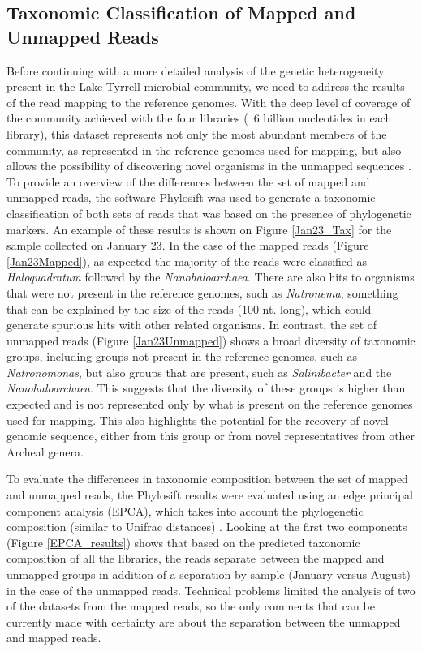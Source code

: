 \clearpage
\subsection{Taxonomic Classification of Mapped and Unmapped Reads}

Before continuing with a more detailed analysis of the genetic heterogeneity present in the Lake Tyrrell microbial community, we need to address the results of the read mapping to the reference genomes. With the deep level of coverage of the community achieved with the four libraries (~6 billion nucleotides in each library), this dataset represents not only the most abundant members of the community, as represented in the reference genomes used for mapping, but also allows the possibility of discovering novel organisms in the unmapped sequences \cite{Narasingarao:2012kp,Albertsen:2013gpa}. To provide an overview of the differences between the set of mapped and unmapped reads, the software Phylosift  \cite{Darling:2014ej} was used to generate a taxonomic classification of both sets of reads that was based on the presence of phylogenetic markers. An example of these results is shown on Figure \ref{Jan23_Tax} for the sample collected on January 23. In the case of the mapped reads (Figure \ref{Jan23Mapped}), as expected the majority of the reads were classified as \textit{Haloquadratum} followed by the \textit{Nanohaloarchaea}. There are also hits to organisms that were not present in the reference genomes, such as \textit{Natronema}, something that can be explained by the size of the reads (100 nt. long), which could generate spurious hits with other related organisms. In contrast, the set of unmapped reads (Figure \ref{Jan23Unmapped}) shows a broad diversity of taxonomic groups, including groups not present in the reference genomes, such as \textit{Natronomonas}, but also groups that are present, such as \textit{Salinibacter} and the \textit{Nanohaloarchaea}. This suggests that the diversity of these groups is higher than expected and is not represented only by what is present on the reference genomes used for mapping. This also highlights the potential for the recovery of novel genomic sequence, either from this group or from novel representatives from other Archeal genera.

To evaluate the differences in taxonomic composition between the set of mapped and unmapped reads, the Phylosift results were evaluated using an edge principal component analysis (EPCA), which takes into account the phylogenetic composition (similar to Unifrac distances) \cite{Matsen:2011wn}. Looking at the first two components (Figure \ref{EPCA_results}) shows that based on the predicted taxonomic composition of all the libraries, the reads separate between the mapped and unmapped groups in addition of a separation by sample (January versus August) in the case of the unmapped reads. Technical problems limited the analysis of two of the datasets from the mapped reads, so the only comments that can be currently made with certainty are about the separation between the unmapped and mapped reads.

